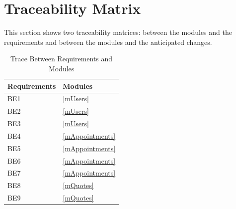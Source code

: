 \documentclass[12pt, titlepage]{article}
\begin{document}
\newpage

\section{Traceability Matrix} \label{SecTM}

This section shows two traceability matrices: between the modules and the requirements and between
the modules and the anticipated changes.

\begin{longtable}{p{} p{}}
	\caption{Trace Between Requirements and Modules} \label{TblRT}                                                                                 \\
	\toprule
	\textbf{Requirements} & \textbf{Modules}                                                                                                       \\
	\midrule
	BE1                   & \ref{mUsers}                                                                                                           \\
	BE2                   & \ref{mUsers}                                                                                                           \\
	BE3                   & \ref{mUsers}                                                                                                           \\
	BE4                   & \ref{mAppointments}                                                                                                    \\
	BE5                   & \ref{mAppointments}                                                                                                    \\
	BE6                   & \ref{mAppointments}                                                                                                    \\
	BE7                   & \ref{mAppointments}                                                                                                    \\
	BE8                   & \ref{mQuotes}                                                                                                          \\
	BE9                   & \ref{mQuotes}                                                                                                          \\

\end{longtable}
\end{document}
